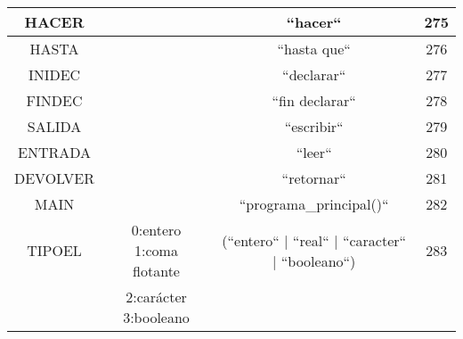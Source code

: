 \begin{table}
\begin{tabular}{| c | c | c | c |}
HACER& & ``hacer`` & 275\\ \hline
HASTA& & ``hasta que`` & 276\\ \hline
INIDEC& & ``declarar`` & 277\\ \hline
FINDEC& & ``fin declarar`` & 278\\ \hline
SALIDA & & ``escribir`` & 279\\ \hline
ENTRADA & & ``leer`` & 280\\ \hline
DEVOLVER & & ``retornar`` & 281\\ \hline
MAIN & & ``programa\_principal()`` & 282\\ \hline
TIPOEL & 0:entero 1:coma flotante  & (``entero`` | ``real`` | ``caracter`` | ``booleano``) & 283\\ 
& 2:carácter 3:booleano& & \\ \hline

\end{tabular}
\end{table}


